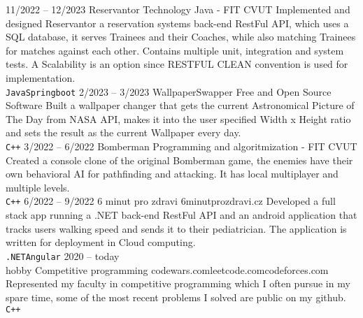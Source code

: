 \documentclass[9pt]{developercv} %
\begin{document}


\begin{entrylist}
	\entry
		{11/2022 -- 12/2023}
		{Reservantor}
		{Technology Java - FIT CVUT}
		{Implemented and designed Reservantor a reservation systems back-end RestFul API, which uses a SQL database, it serves Trainees and their Coaches, while also matching Trainees for matches against each other. Contains multiple unit, integration and system tests. A Scalability is an option since RESTFUL CLEAN convention is used for implementation.\\ \texttt{Java}\slashsep\texttt{Springboot}}
	\entry
		{2/2023 -- 3/2023}
		{WallpaperSwapper}
		{Free and Open Source Software}
		{Built a wallpaper changer that gets the current Astronomical Picture of The Day from NASA API, makes it into the user specified Width x Height ratio and sets the result as the current Wallpaper every day.\\ \texttt{C++}}
	\entry
		{3/2022 -- 6/2022}
		{Bomberman}
		{Programming and algoritmization - FIT CVUT}
		{Created a console clone of the original Bomberman game, the enemies have their own behavioral AI for pathfinding and attacking. It has local multiplayer and multiple levels.\\ \texttt{C++}}
	\entry
		{6/2022 -- 9/2022}
		{6 minut pro zdravi}
		{6minutprozdravi.cz}
		{Developed a full stack app running a .NET back-end RestFul API and an android application that tracks users walking speed and sends it to their pediatrician. The application is written for deployment in Cloud computing.\\ \texttt{.NET}\slashsep\texttt{Angular}}
	\entry
		{2020 -- today\\\footnotesize{hobby}}
		{Competitive programming}
		{codewars.com\slashsep leetcode.com\slashsep codeforces.com}
		{Represented my faculty in competitive programming which I often pursue in my spare time, some of the most recent problems I solved are public on my github. \\ \texttt{C++}}
\end{entrylist}

\end{document}
